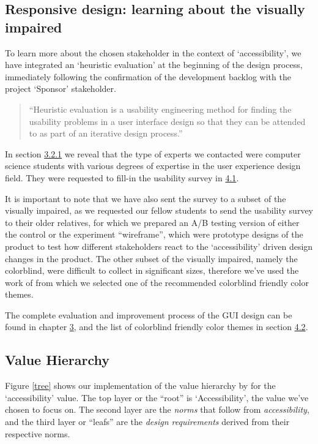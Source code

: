 \documentclass{article}
\begin{document}
\subsection{Responsive design: learning about the visually impaired\label{stakeholderSupport}}

To learn more about the chosen stakeholder in the context of `accessibility', we have integrated an
`heuristic evaluation' at the beginning of the design process, immediately following the confirmation of the development backlog with the project `Sponsor' stakeholder.

\begin{quote}
``Heuristic evaluation is a usability engineering method for finding the usability problems in a user interface design so that
they can be attended to as part of an iterative design process.'' \parencite{Nielsen1994}
\end{quote}

In section \hyperref[experts]{3.2.1} we reveal that the type of experts we contacted were computer science students with
various degrees of expertise in the user experience design field. They were requested to fill-in the usability survey in \hyperref[survey]{4.1}.

It is important to note that we have also sent the survey to a subset of the visually impaired, as we requested our fellow students
to send the usability survey to their older relatives, for which we prepared an A/B testing version of either the control or the  experiment ``wireframe'',
which were prototype designs of the product to test how different stakeholders react to the `accessibility' driven
design changes in the product. The other subset of the visually impaired, namely the colorblind, were difficult to collect in significant sizes, therefore
we've used the work of \textcite{Hobbins2018} from which we selected one of the recommended colorblind friendly color themes.

The complete evaluation and improvement process of the GUI design can be found in chapter \hyperref[hci]{3},
and the list of colorblind friendly color themes in section \hyperref[colors]{4.2}.

\subsection{Value Hierarchy\label{valueHierarchy}}

Figure \ref{tree} shows our implementation of the value hierarchy by \textcite{vandePoel2013} for the `accessibility' value.
The top layer or the ``root'' is `Accessibility', the value we've chosen to focus on. The second layer are the \emph{norms} that follow
from \emph{accessibility},  and the third layer or ``leafs'' are the \emph{design requirements} derived from their respective norms.
\end{document}

